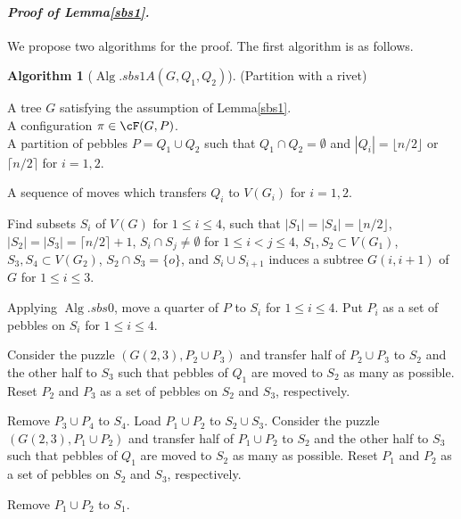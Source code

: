 \documentclass[letter,11pt]{article}
\newcommand{\white}{\qquad{\framebox{\rule{0pt}{4pt}}}}
\newcommand{\owari}{\hfill\white}
\theoremstyle{definition}
\theoremstyle{definition}
\newtheorem{alg}{Algorithm}
\DeclareMathOperator{\Alg}{Alg}
\newcommand{\1}{\boldmath$~1~$\unboldmath}
\newcommand{\qedgo}{\vspace{0.35cm}}
\newcommand{\tume}{\hspace*{0.2em}}
\newcommand{\maru}[1]{{\ooalign{\hfill$\small#1$\hfill\crcr\scalebox{1.3}{$\bigcirc$}}}}
\newenvironment{alg-enumerate}{%
  \begin{enumerate}%
   \renewcommand{\theenumi}{\arabic{enumi}}%
   \renewcommand{\labelenumi}{\rm{{\maru{\theenumi}}\tume\/}}%
   \renewcommand{\labelenumii}{\rm{$(${\maru{\theenumi}}-\theenumii$)$\tume\/}}%
 }{\end{enumerate}%
}
\newenvironment{Proofof}[1]{\expandafter
\paragraph{{\it Proof of #1.}}}{\hspace{5mm}\owari\qedgo}
\newcommand{\namelistlabel}[1]{\hspace*{10pt}\mbox{#1}:\hspace{\fill}}
\newenvironment{namelist}[1]{%
    \begin{list}{}
      {\let\makelabel\namelistlabel
      \settowidth{\labelwidth}{#1}
      \setlength{\leftmargin}{1.1\labelwidth}
      \setlength{\labelsep}{5pt}
      \setlength{\parsep}{0pt}}
  }{%
  \end{list}}
\begin{document}

\begin{Proofof}{Lemma\tume\ref{sbs1}}
We propose two algorithms for the proof.
The first algorithm is as follows. 

\begin{alg}[$\Alg.sbs1A(G, Q_1, Q_2)$](Partition with a rivet)\hfill
\begin{namelist}{OUTPUT}
\item[\sl Input]{A tree $G$ satisfying the assumption of Lemma\tume\ref{sbs1}.\\
A configuration $\pi \in \cF(G, P)$.\\
A partition of pebbles $P = Q_1 \cup Q_2$ such that $Q_1 \cap Q_2 = \emptyset$ and $|Q_i| = \lfloor n/2 \rfloor$ or $\lceil n/2 \rceil$ for $i=1, 2$.  
}
\item[\sl Output]{A sequence of moves which transfers $Q_i$ to $V(G_i)$ for $i = 1, 2$.}
\end{namelist}
\begin{alg-enumerate}
\item Find subsets $S_i$ of $V(G)$ for $1 \le i \le 4$, such that $|S_1| = |S_4| = \lfloor n/2 \rfloor$, $|S_2| = |S_3| = \lceil n/2 \rceil + 1$, $S_i \cap S_j \ne \emptyset$ for $1 \le i < j \le 4$, $S_1, S_2 \subset V(G_1)$, $S_3, S_4 \subset V(G_2)$, $S_2 \cap S_3 = \{ o \}$, and $S_i \cup S_{i+1}$ induces a subtree $G(i, i+1)$ of $G$ for $1 \le i \le 3$. 
\item Applying $\Alg.sbs0$, move a quarter of $P$ to $S_i$ for $1 \le i \le 4$.
Put $P_i$ as a set of pebbles on $S_i$ for $1 \le i \le 4$.
\item Consider the puzzle $(G(2,3), P_2 \cup P_3)$ and transfer half of $P_2 \cup P_3$ to $S_2$ and the other half to $S_3$ such that pebbles of $Q_1$ are moved to $S_2$ as many as possible.
Reset $P_2$ and $P_3$ as a set of pebbles on $S_2$ and $S_3$, respectively.
\item Remove $P_3 \cup P_4$ to $S_4$.
Load $P_1 \cup P_2$ to $S_2 \cup S_3$. 
Consider the puzzle $(G(2,3), P_1 \cup P_2)$ and transfer half of $P_1 \cup P_2$ to $S_2$ and the other half to $S_3$ such that pebbles of $Q_1$ are moved to $S_2$ as many as possible.
Reset $P_1$ and $P_2$ as a set of pebbles on $S_2$ and $S_3$, respectively.
\item Remove $P_1 \cup P_2$ to $S_1$.

\end{alg-enumerate}
\end{alg}
\end{Proofof}
\end{document}
